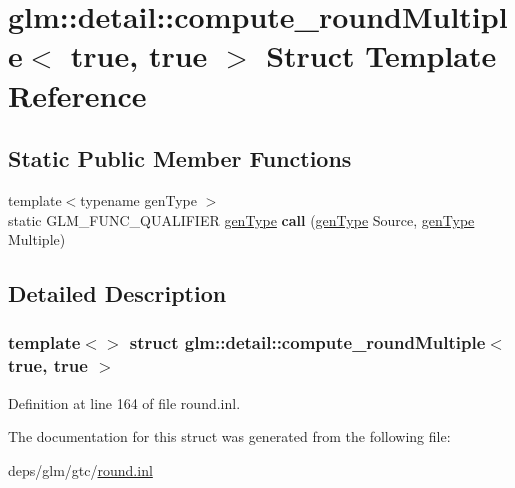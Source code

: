 \hypertarget{structglm_1_1detail_1_1compute__roundMultiple_3_01true_00_01true_01_4}{}\section{glm\+:\+:detail\+:\+:compute\+\_\+round\+Multiple$<$ true, true $>$ Struct Template Reference}
\label{structglm_1_1detail_1_1compute__roundMultiple_3_01true_00_01true_01_4}
\subsection*{Static Public Member Functions}
\begin{DoxyCompactItemize}
\item 
\mbox{\label{structglm_1_1detail_1_1compute__roundMultiple_3_01true_00_01true_01_4_ad2ba30e3338e768e6119c957f44b2216}} 
{\footnotesize template$<$typename gen\+Type $>$ }\\static G\+L\+M\+\_\+\+F\+U\+N\+C\+\_\+\+Q\+U\+A\+L\+I\+F\+I\+ER \hyperlink{structglm_1_1detail_1_1genType}{gen\+Type} {\bfseries call} (\hyperlink{structglm_1_1detail_1_1genType}{gen\+Type} Source, \hyperlink{structglm_1_1detail_1_1genType}{gen\+Type} Multiple)
\end{DoxyCompactItemize}


\subsection{Detailed Description}
\subsubsection*{template$<$$>$\newline
struct glm\+::detail\+::compute\+\_\+round\+Multiple$<$ true, true $>$}



Definition at line 164 of file round.\+inl.



The documentation for this struct was generated from the following file\+:\begin{DoxyCompactItemize}
\item 
deps/glm/gtc/\hyperlink{round_8inl}{round.\+inl}\end{DoxyCompactItemize}
